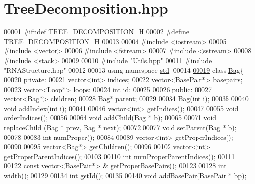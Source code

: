 \hypertarget{_tree_decomposition_8hpp_source}{}\section{Tree\+Decomposition.\+hpp}
\label{_tree_decomposition_8hpp_source}

\begin{DoxyCode}
00001 \textcolor{preprocessor}{#ifndef TREE\_DECOMPOSITION\_H}
00002 \textcolor{preprocessor}{#define TREE\_DECOMPOSITION\_H}
00003 
00004 \textcolor{preprocessor}{#include <iostream>}
00005 \textcolor{preprocessor}{#include <vector>}
00006 \textcolor{preprocessor}{#include <fstream>}
00007 \textcolor{preprocessor}{#include <sstream>}
00008 \textcolor{preprocessor}{#include <stack>}
00009 
00010 \textcolor{preprocessor}{#include "Utils.hpp"}
00011 \textcolor{preprocessor}{#include "RNAStructure.hpp"}
00012 
00013 \textcolor{keyword}{using namespace }\hyperlink{namespacestd}{std};
00014 
\hyperlink{class_bag}{00019} \textcolor{keyword}{class }\hyperlink{class_bag}{Bag}\{
00020   \textcolor{keyword}{private}:
00021     vector<int> indices;
00022     vector<BasePair*> basepairs;
00023     vector<Loop*> loops;
00024     \textcolor{keywordtype}{int} id;
00025 
00026   \textcolor{keyword}{public}:
00027     vector<Bag*> children;
00028     \hyperlink{class_bag}{Bag}* parent;
00029 
00034     \hyperlink{class_bag}{Bag}(\textcolor{keywordtype}{int} i);
00035 
00040     \textcolor{keywordtype}{void} addIndex(\textcolor{keywordtype}{int} i);
00041 
00046     vector<int> getIndices();
00047 
00055     \textcolor{keywordtype}{void} orderIndices();
00056 
00064     \textcolor{keywordtype}{void} addChild(\hyperlink{class_bag}{Bag} * b);
00065 
00071     \textcolor{keywordtype}{void} replaceChild (\hyperlink{class_bag}{Bag} * prev, \hyperlink{class_bag}{Bag} * next);
00072 
00077     \textcolor{keywordtype}{void} setParent(\hyperlink{class_bag}{Bag} * b);
00078 
00083     \textcolor{keywordtype}{int} numProper();
00084     
00089     vector<int> getProperIndices();
00090     
00095     vector<Bag*> getChildren();
00096 
00102     vector<int> getProperParentIndices();
00103 
00110     \textcolor{keywordtype}{int} numProperParentIndices();
00111 
00122     \textcolor{keyword}{const} vector<BasePair*> & getProperBasePairs();
00123 
00128     \textcolor{keywordtype}{int} width();
00129     
00134     \textcolor{keywordtype}{int} getId();
00135     
00140     \textcolor{keywordtype}{void} addBasePair(\hyperlink{class_base_pair}{BasePair} * bp);

\end{DoxyCode}
